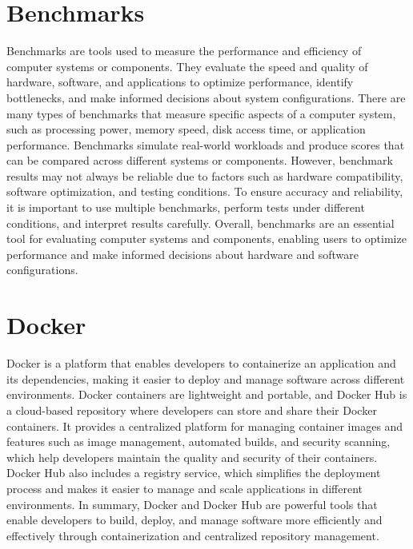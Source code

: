 \section{Benchmarks}
Benchmarks are tools used to measure the performance and efficiency of computer systems or components.
They evaluate the speed and quality of hardware, software, and applications to optimize performance, identify bottlenecks, and make informed decisions about system configurations.
There are many types of benchmarks that measure specific aspects of a computer system, such as processing power, memory speed, disk access time, or application performance.
Benchmarks simulate real-world workloads and produce scores that can be compared across different systems or components.
However, benchmark results may not always be reliable due to factors such as hardware compatibility, software optimization, and testing conditions.
To ensure accuracy and reliability, it is important to use multiple benchmarks, perform tests under different conditions, and interpret results carefully.
Overall, benchmarks are an essential tool for evaluating computer systems and components, enabling users to optimize performance and make informed decisions about hardware and software configurations.

\section{Docker}
Docker is a platform that enables developers to containerize an application and its dependencies, making it easier to deploy and manage software across different environments.
Docker containers are lightweight and portable, and Docker Hub is a cloud-based repository where developers can store and share their Docker containers.
It provides a centralized platform for managing container images and features such as image management, automated builds, and security scanning, which help developers maintain the quality and security of their containers.
Docker Hub also includes a registry service, which simplifies the deployment process and makes it easier to manage and scale applications in different environments.
In summary, Docker and Docker Hub are powerful tools that enable developers to build, deploy, and manage software more efficiently and effectively through containerization and centralized repository management.


